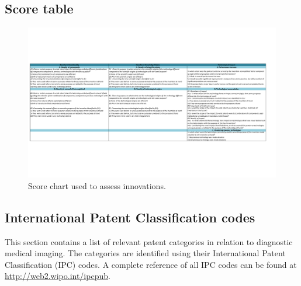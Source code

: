 \appendix
\tocless \chapter{}
\begin{landscape}
	\section{Score table}
		\begin{figure}[htp]
		\begin{center}
		  \includegraphics[width=\linewidth, trim=5 150 60 150]{img/score.pdf}
		  \caption{Score chart used to assess innovations.}
		  \label{fig:score}
		\end{center}
		\end{figure}
\end{landscape}

\section{International Patent Classification codes}
This section contains a list of relevant patent categories in relation to
diagnostic medical imaging. The categories are identified using their
International Patent Classification (IPC) codes. A complete reference of all IPC
codes can be found at \url{http://web2.wipo.int/ipcpub}.

